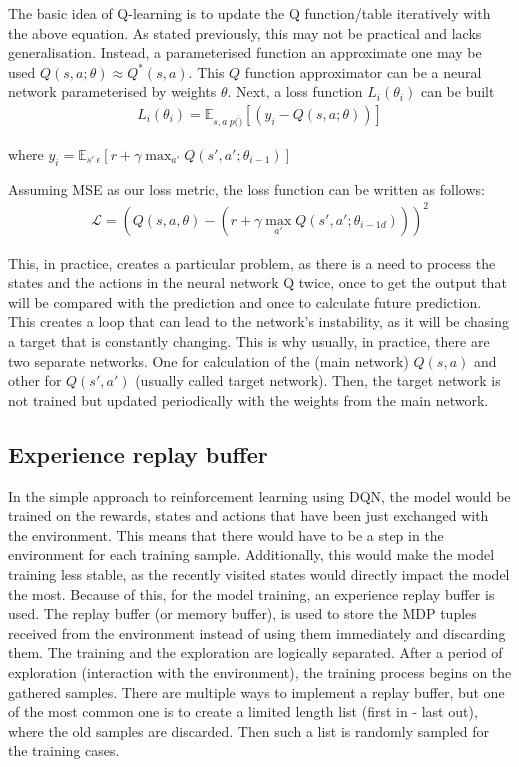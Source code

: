 The basic idea of Q-learning is to update the Q function/table iteratively with the above equation.
As stated previously, this may not be practical and lacks generalisation.
Instead, a parameterised function an approximate one may be used $Q(s,a;\theta) \approx Q^{*}(s,a)$.
This $Q$ function approximator can be a neural network parameterised by weights $\theta$.
Next, a loss function $L_{i}(\theta_{i})$ can be built
\begin{align}
L_{i}(\theta_{i}) = \mathbb{E}_{s,a~p(\dot)}\left[(y_{i} - Q(s,a;\theta))\right]
\end{align}

where $y_{i} = \mathbb{E}_{s'~\epsilon}\left[r+\gamma \max_{a'}Q(s',a';\theta_{i-1})\right]$

Assuming MSE as our loss metric, the loss function can be written as follows:
\begin{align}
\mathcal{L} = (Q(s,a,\theta) - (r+\gamma\max_{a'}Q(s',a';\theta_{i-1d})))^{2}
\end{align}

This, in practice, creates a particular problem, as there is a need to process the states and the actions in the neural network Q twice, once to get the output that will be compared with the prediction and once to calculate future prediction. This creates a loop that can lead to the network's instability, as it will be chasing a target that is constantly changing. This is why usually, in practice, there are two separate networks. One for calculation of the (main network) $Q(s,a)$ and other for $Q(s',a')$ (usually called target network). Then, the target network is not trained but updated periodically with the weights from the main network.

\subsection{Experience replay buffer}

In the simple approach to reinforcement learning using DQN, the model would be trained on the rewards, states and actions that have been just exchanged with the environment.
This means that there would have to be a step in the environment for each training sample.
Additionally, this would make the model training less stable, as the recently visited states would directly impact the model the most.
Because of this, for the model training, an experience replay buffer is used.
The replay buffer (or memory buffer), is used to store the MDP tuples received from the environment instead of using them immediately and discarding them.
The training and the exploration are logically separated.
After a period of exploration (interaction with the environment), the training process begins on the gathered samples.
There are multiple ways to implement a replay buffer, but one of the most common one is to create a limited length list (first in - last out), where the old samples are discarded.
Then such a list is randomly sampled for the training cases.

